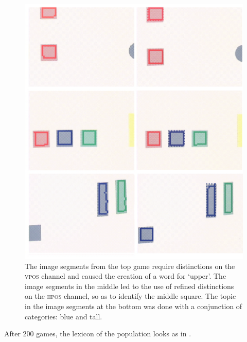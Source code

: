 \begin{figure}
\begin{center}
\includegraphics[width=0.8\columnwidth]{chap7/figs/plate-15-vpos.pdf}
\end{center}
\caption{The image segments from the top game require 
distinctions on the \textsc{vpos} channel and 
caused the creation of a word for `upper'. The image 
segments in the middle led to the use of refined
distinctions on the \textsc{hpos} channel, so as to 
identify the middle square. The topic in the 
image segments at the bottom was done with a 
conjunction of categories: blue and tall.}
\label{fig:plate-15}
\end{figure}

After 200 games, the lexicon of the population looks as in . 

